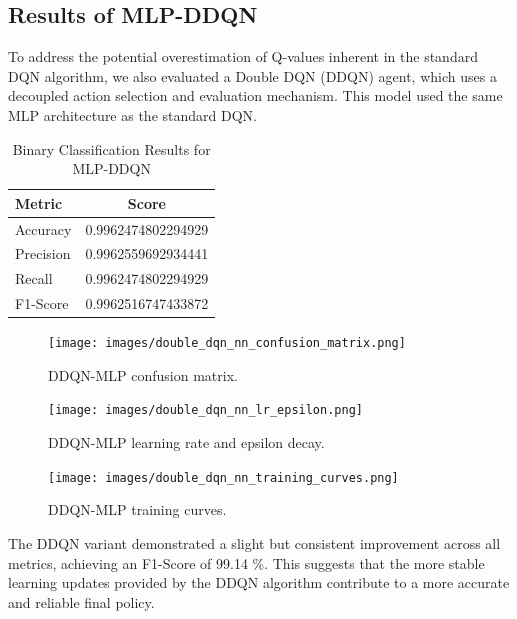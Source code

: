 \documentclass[12pt]{report}
\begin{document}
\subsection{Results of MLP-DDQN}
To address the potential overestimation of Q-values inherent in the standard DQN algorithm, we also evaluated a Double DQN (DDQN) agent, which uses a decoupled action selection and evaluation mechanism. This model used the same MLP architecture as the standard DQN.

\begin{table}[H]
    \centering
    \caption{Binary Classification Results for MLP-DDQN}
    \label{tab:binary_ddqn_results}
    \begin{tabular}{@{}lc@{}}
        \toprule
        \textbf{Metric} & \textbf{Score} \\
        \midrule
        Accuracy & 0.9962474802294929 \\
        Precision & 0.9962559692934441 \\
        Recall & 0.9962474802294929 \\
        F1-Score & 0.9962516747433872 \\
        \bottomrule
    \end{tabular}
\end{table}
\begin{figure}[htbp]
    \centering
    \texttt{[image: images/double\_dqn\_nn\_confusion\_matrix.png]}
    \caption{DDQN-MLP confusion matrix.}
    \label{fig:ddqn_nn_confusion}
\end{figure}

\vspace{0.5cm}

\begin{figure}[htbp]
    \centering
    \texttt{[image: images/double\_dqn\_nn\_lr\_epsilon.png]}
    \caption{DDQN-MLP learning rate and epsilon decay.}
    \label{fig:ddqn_nn_lr_epsilon_nn}
\end{figure}

\vspace{0.5cm}

\begin{figure}[htbp]
    \centering
    \texttt{[image: images/double\_dqn\_nn\_training\_curves.png]}
    \caption{DDQN-MLP training curves.}
    \label{fig:ddqn_nn_training_curves}
\end{figure}

The DDQN variant demonstrated a slight but consistent improvement across all metrics, achieving an F1-Score of 99.14 \%. This suggests that the more stable learning updates provided by the DDQN algorithm contribute to a more accurate and reliable final policy.
\end{document}
